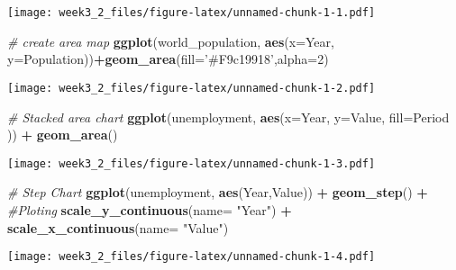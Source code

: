 \documentclass[
]{article}
\newenvironment{Shaded}{\begin{snugshade}}{\end{snugshade}}
\newcommand{\CommentTok}[1]{\textcolor[rgb]{0.56,0.35,0.01}{\textit{#1}}}
\newcommand{\DataTypeTok}[1]{\textcolor[rgb]{0.13,0.29,0.53}{#1}}
\newcommand{\DecValTok}[1]{\textcolor[rgb]{0.00,0.00,0.81}{#1}}
\newcommand{\KeywordTok}[1]{\textcolor[rgb]{0.13,0.29,0.53}{\textbf{#1}}}
\newcommand{\NormalTok}[1]{#1}
\newcommand{\OperatorTok}[1]{\textcolor[rgb]{0.81,0.36,0.00}{\textbf{#1}}}
\newcommand{\StringTok}[1]{\textcolor[rgb]{0.31,0.60,0.02}{#1}}
\begin{document}
\texttt{[image: week3\_2\_files/figure-latex/unnamed-chunk-1-1.pdf]}

\begin{Shaded}
\begin{Highlighting}[]
\CommentTok{# create area map}
\KeywordTok{ggplot}\NormalTok{(world_population, }\KeywordTok{aes}\NormalTok{(}\DataTypeTok{x=}\NormalTok{Year, }\DataTypeTok{y=}\NormalTok{Population))}\OperatorTok{+}\KeywordTok{geom_area}\NormalTok{(}\DataTypeTok{fill=}\StringTok{'#F9c19918'}\NormalTok{,}\DataTypeTok{alpha=}\DecValTok{2}\NormalTok{)}
\end{Highlighting}
\end{Shaded}

\texttt{[image: week3\_2\_files/figure-latex/unnamed-chunk-1-2.pdf]}

\begin{Shaded}
\begin{Highlighting}[]
\CommentTok{# Stacked area chart}
\KeywordTok{ggplot}\NormalTok{(unemployment, }\KeywordTok{aes}\NormalTok{(}\DataTypeTok{x=}\NormalTok{Year, }\DataTypeTok{y=}\NormalTok{Value, }\DataTypeTok{fill=}\NormalTok{Period )) }\OperatorTok{+}\StringTok{ }
\StringTok{  }\KeywordTok{geom_area}\NormalTok{()}
\end{Highlighting}
\end{Shaded}

\texttt{[image: week3\_2\_files/figure-latex/unnamed-chunk-1-3.pdf]}

\begin{Shaded}
\begin{Highlighting}[]
\CommentTok{# Step Chart}
\KeywordTok{ggplot}\NormalTok{(unemployment, }\KeywordTok{aes}\NormalTok{(Year,Value)) }\OperatorTok{+}\StringTok{ }\KeywordTok{geom_step}\NormalTok{() }\OperatorTok{+}\StringTok{ }\CommentTok{#Ploting}
\StringTok{  }\KeywordTok{scale_y_continuous}\NormalTok{(}\DataTypeTok{name=} \StringTok{"Year"}\NormalTok{) }\OperatorTok{+}
\StringTok{  }\KeywordTok{scale_x_continuous}\NormalTok{(}\DataTypeTok{name=} \StringTok{"Value"}\NormalTok{)}
\end{Highlighting}
\end{Shaded}

\texttt{[image: week3\_2\_files/figure-latex/unnamed-chunk-1-4.pdf]}
\end{document}
